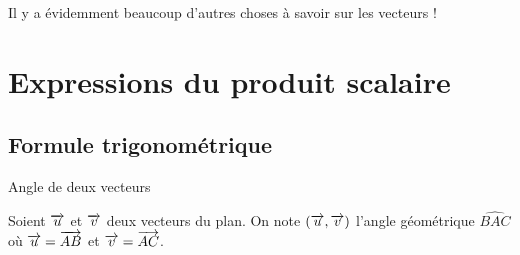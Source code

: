 \documentclass[11pt]{article}
\begin{document}
\begin{rmq}
  Il y a évidemment beaucoup d'autres choses à savoir sur les vecteurs !
\end{rmq}

\section{Expressions du produit scalaire}
\subsection{Formule trigonométrique}
\begin{defi}{Angle de deux vecteurs}~\\[-5mm]
  \begin{minipage}{.8\textwidth}
    Soient $\overrightarrow{u}$ et $\overrightarrow{v}$ deux vecteurs du plan. On note $(\overrightarrow{u},
    \overrightarrow{v})$ l'angle géométrique $\widehat{BAC}$ où $\overrightarrow{u}=\overrightarrow{AB}$ et
    $\overrightarrow{v}=\overrightarrow{AC}$. 
  \end{minipage}
  \begin{minipage}{.2\textwidth}
    \begin{center}
    \end{center}
  \end{minipage}
\end{defi}
\end{document}
